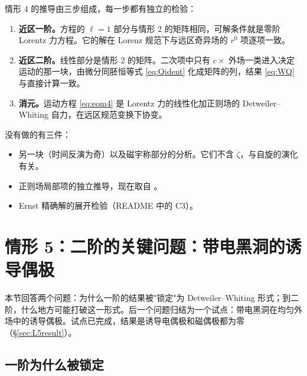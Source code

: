 \documentclass[11pt,a4paper]{ctexart}
\numberwithin{equation}{section}
\begin{document}
情形 4 的推导由三步组成，每一步都有独立的检验：
\begin{enumerate}
\item \textbf{近区一阶。}方程的 $\ell=1$ 部分与情形 2 的矩阵相同，可解条件就是零阶 Lorentz 力方程。它的解在 Lorenz 规范下与远区奇异场的 $r^0$ 项逐项一致。
\item \textbf{近区二阶。}线性部分是情形 2 的矩阵。二次项中只有 $c\times$ 外场一类进入决定运动的那一块，由微分同胚恒等式 \eqref{eq:Qident} 化成矩阵的列，结果 \eqref{eq:WQ} 与直接计算一致。
\item \textbf{消元。}运动方程 \eqref{eq:eom4} 是 Lorentz 力的线性化加正则场的 Detweiler--Whiting 自力，在远区规范变换下协变。
\end{enumerate}
没有做的有三件：
\begin{itemize}
\item 另一块（时间反演为奇）以及磁宇称部分的分析。它们不含 $\ddot\zeta$，与自旋的演化有关。
\item 正则场局部项的独立推导，现在取自 \citet{ZimmermanPoisson2014}。
\item Ernst 精确解的展开检验（README 中的 C3）。
\end{itemize}

\section[情形 5：二阶的关键问题：带电黑洞的诱导偶极]{情形 5：二阶的关键问题：带电黑洞的诱导偶极}
\label{sec:L5}

本节回答两个问题：为什么一阶的结果被"锁定"为 Detweiler--Whiting 形式；到二阶，什么地方可能打破这一形式。后一个问题归结为一个试点：带电黑洞在均匀外场中的诱导偶极。试点已完成，结果是诱导电偶极和磁偶极都为零（\S\ref{sec:L5result}）。

\subsection{一阶为什么被锁定}
\label{sec:L5why}
\end{document}
